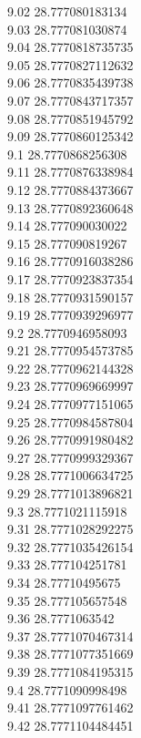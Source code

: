 {9.02	28.777080183134\\
9.03	28.777081030874\\
9.04	28.7770818735735\\
9.05	28.7770827112632\\
9.06	28.7770835439738\\
9.07	28.7770843717357\\
9.08	28.7770851945792\\
9.09	28.7770860125342\\
9.1	28.7770868256308\\
9.11	28.7770876338984\\
9.12	28.7770884373667\\
9.13	28.7770892360648\\
9.14	28.777090030022\\
9.15	28.777090819267\\
9.16	28.7770916038286\\
9.17	28.7770923837354\\
9.18	28.7770931590157\\
9.19	28.7770939296977\\
9.2	28.7770946958093\\
9.21	28.7770954573785\\
9.22	28.7770962144328\\
9.23	28.7770969669997\\
9.24	28.7770977151065\\
9.25	28.7770984587804\\
9.26	28.7770991980482\\
9.27	28.7770999329367\\
9.28	28.7771006634725\\
9.29	28.7771013896821\\
9.3	28.7771021115918\\
9.31	28.7771028292275\\
9.32	28.7771035426154\\
9.33	28.777104251781\\
9.34	28.77710495675\\
9.35	28.777105657548\\
9.36	28.7771063542\\
9.37	28.7771070467314\\
9.38	28.7771077351669\\
9.39	28.7771084195315\\
9.4	28.7771090998498\\
9.41	28.7771097761462\\
9.42	28.7771104484451\\
}
